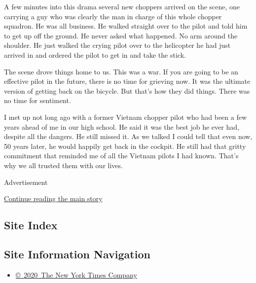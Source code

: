 A few minutes into this drama several new choppers arrived on the scene,
one carrying a guy who was clearly the man in charge of this whole
chopper squadron. He was all business. He walked straight over to the
pilot and told him to get up off the ground. He never asked what
happened. No arm around the shoulder. He just walked the crying pilot
over to the helicopter he had just arrived in and ordered the pilot to
get in and take the stick.

The scene drove things home to us. This was a war. If you are going to
be an effective pilot in the future, there is no time for grieving now.
It was the ultimate version of getting back on the bicycle. But that's
how they did things. There was no time for sentiment.

I met up not long ago with a former Vietnam chopper pilot who had been a
few years ahead of me in our high school. He said it was the best job he
ever had, despite all the dangers. He still missed it. As we talked I
could tell that even now, 50 years later, he would happily get back in
the cockpit. He still had that gritty commitment that reminded me of all
the Vietnam pilots I had known. That's why we all trusted them with our
lives.

Advertisement

\protect\hyperlink{after-bottom}{Continue reading the main story}

\hypertarget{site-index}{%
\subsection{Site Index}\label{site-index}}

\hypertarget{site-information-navigation}{%
\subsection{Site Information
Navigation}\label{site-information-navigation}}

\begin{itemize}
\tightlist
\item
  \href{https://help.nytimes3xbfgragh.onion/hc/en-us/articles/115014792127-Copyright-notice}{©~2020~The
  New York Times Company}
\end{itemize}

